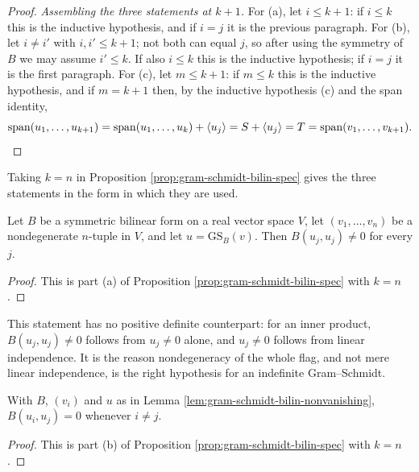 \begin{proof}
\emph{Assembling the three statements at $k+1$.} For (a), let $i \leq k+1$: if $i \leq k$ this is the inductive hypothesis, and if $i = j$ it is the previous paragraph. For (b), let $i \neq i'$ with $i,i' \leq k+1$; not both can equal $j$, so after using the symmetry of $B$ we may assume $i' \leq k$. If also $i \leq k$ this is the inductive hypothesis; if $i = j$ it is the first paragraph. For (c), let $m \leq k+1$: if $m \leq k$ this is the inductive hypothesis, and if $m = k+1$ then, by the inductive hypothesis (c) and the span identity,
\[
\operatorname{span}(u_1,\ldots,u_{k+1}) = \operatorname{span}(u_1,\ldots,u_k) + \langle u_j\rangle = S + \langle u_j \rangle = T = \operatorname{span}(v_1,\ldots,v_{k+1}) . \qedhere
\]
\end{proof}

Taking $k = n$ in Proposition \ref{prop:gram-schmidt-bilin-spec} gives the three statements in the form in which they are used.

\begin{lemma}
\label{lem:gram-schmidt-bilin-nonvanishing}
\leanok
{}
Let $B$ be a symmetric bilinear form on a real vector space $V$, let $(v_1,\ldots,v_n)$ be a nondegenerate $n$-tuple in $V$, and let $u = \mathrm{GS}_B(v)$. Then $B(u_j,u_j) \neq 0$ for every $j$.
\end{lemma}

\begin{proof}
\leanok
{}
This is part (a) of Proposition \ref{prop:gram-schmidt-bilin-spec} with $k = n$.
\end{proof}

This statement has no positive definite counterpart: for an inner product, $B(u_j,u_j) \neq 0$ follows from $u_j \neq 0$ alone, and $u_j \neq 0$ follows from linear independence. It is the reason nondegeneracy of the whole flag, and not mere linear independence, is the right hypothesis for an indefinite Gram--Schmidt.

\begin{lemma}
\label{lem:gram-schmidt-bilin-orthogonal}
\leanok
{}
With $B$, $(v_i)$ and $u$ as in Lemma \ref{lem:gram-schmidt-bilin-nonvanishing}, $B(u_i,u_j) = 0$ whenever $i \neq j$.
\end{lemma}

\begin{proof}
\leanok
{}
This is part (b) of Proposition \ref{prop:gram-schmidt-bilin-spec} with $k = n$.
\end{proof}

